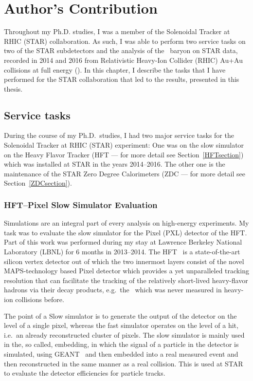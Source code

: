 \chapter*{Author's Contribution}
Throughout my Ph.D. studies, I was a member of the Solenoidal Tracker at RHIC (STAR) collaboration. As such, I was able to perform two service tasks on two of the STAR subdetectors and the analysis of the \Lambdac\ baryon on STAR data, recorded in 2014 and 2016 from Relativistic Heavy-Ion Collider (RHIC) Au+Au collisions at full energy (\snnFull)\@. In this chapter, I describe the tasks that I have performed for the STAR collaboration that led to the results, presented in this thesis.


\section*{Service tasks}
During the course of my Ph.D.\ studies, I had two major service tasks for the Solenoidal Tracker at RHIC (STAR) experiment: One was on the slow simulator on the Heavy Flavor Tracker (HFT --- for more detail see Section~\ref{HFTsection}) which was installed at STAR in the years 2014--2016.  The other one is the maintenance of the STAR Zero Degree Calorimeters (ZDC --- for more detail see Section~\ref{ZDCsection}).

\subsection*{HFT--Pixel Slow Simulator Evaluation}
Simulations are an integral part of every analysis on high-energy experiments. My task was to evaluate the slow simulator for the Pixel (PXL) detector of the HFT\@. Part of this work was performed during my stay at Lawrence Berkeley National Laboratory (LBNL) for 6 months in 2013--2014\@. The HFT~\cite{HFTLeo, HftFinal, HftTdr} is a state-of-the-art silicon vertex detector out of which the two innermost layers consist of the novel MAPS-technology based Pixel detector which provides a yet unparalleled tracking resolution that can facilitate the tracking of the relatively short-lived heavy-flavor hadrons via their decay products, e.g.\ the \Lambdac\ which was never measured in heavy-ion collisions before.

The point of a Slow simulator is to generate the output of the detector on the level of a single pixel, whereas the fast simulator operates on the level of a hit, i.e.\ an already reconstructed cluster of pixels. The slow simulator is mainly used in the, so called, embedding, in which the signal of a particle in the detector is simulated, using GEANT~\cite{GEANT} and then embedded into a real measured event and then reconstructed in the same manner as a real collision.
This is used at STAR to evaluate the detector efficiencies for particle tracks.


